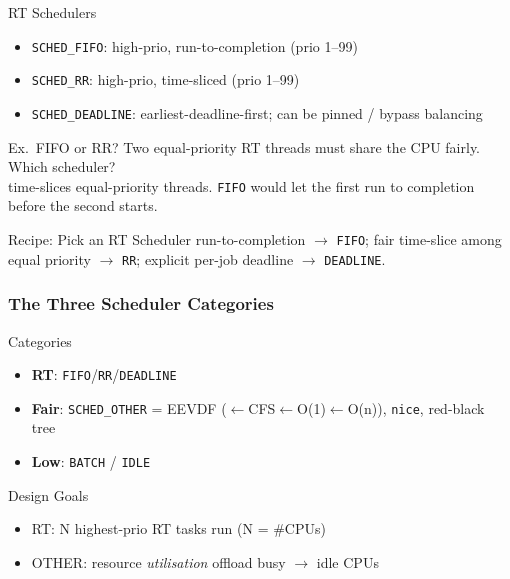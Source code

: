 
\begin{definition}{RT Schedulers}
    \begin{itemize}
        \item \texttt{SCHED\_FIFO}: high-prio, run-to-completion (prio 1--99)
        \item \texttt{SCHED\_RR}: high-prio, time-sliced (prio 1--99)
        \item \texttt{SCHED\_DEADLINE}: earliest-deadline-first; can be pinned / bypass balancing
    \end{itemize}
\end{definition}



\begin{example2}{Ex.\ FIFO or RR?}
    Two equal-priority RT threads must share the CPU fairly. Which scheduler?
     \\ 
     time-slices equal-priority threads. \texttt{FIFO} would let the first run to completion before the second starts.
\end{example2}

\begin{KR}{Recipe: Pick an RT Scheduler}
    run-to-completion $\to$ \texttt{FIFO}; fair time-slice among equal priority $\to$ \texttt{RR}; explicit per-job deadline $\to$ \texttt{DEADLINE}.
\end{KR}

\multend

\subsubsection{The Three Scheduler Categories}


\begin{definition}{Categories}
    \begin{itemize}
        \item \textbf{RT}: \texttt{FIFO}/\texttt{RR}/\texttt{DEADLINE}
        \item \textbf{Fair}: \texttt{SCHED\_OTHER} = EEVDF ($\leftarrow$CFS$\leftarrow$O(1)$\leftarrow$O(n)), \texttt{nice}, red-black tree
        \item \textbf{Low}: \texttt{BATCH} / \texttt{IDLE}
    \end{itemize}
\end{definition}

\begin{concept}{Design Goals}
    \begin{itemize}
        \item RT: N highest-prio RT tasks run (N = \#CPUs)
        \item OTHER: resource \emph{utilisation} offload busy $\to$ idle CPUs
    \end{itemize}
\end{concept}

